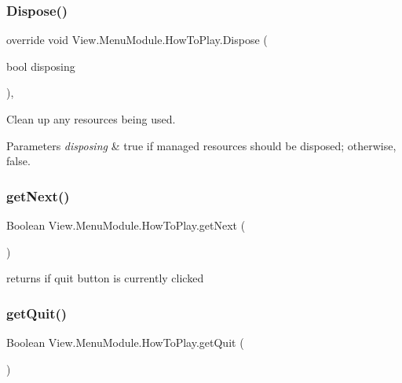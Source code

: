 \subsubsection{\texorpdfstring{Dispose()}{Dispose()}}
{\footnotesize\ttfamily override void View.\+Menu\+Module.\+How\+To\+Play.\+Dispose (\begin{DoxyParamCaption}\item[{bool}]{disposing }\end{DoxyParamCaption})\hspace{0.3cm}{\ttfamily [inline]}, {\ttfamily [protected]}}



Clean up any resources being used. 


\begin{DoxyParams}{Parameters}
{\em disposing} & true if managed resources should be disposed; otherwise, false.\\
\hline
\end{DoxyParams}
\hypertarget{class_view_1_1_menu_module_1_1_how_to_play_a5c48be1846170e30469c7523d95c2758}{}\label{class_view_1_1_menu_module_1_1_how_to_play_a5c48be1846170e30469c7523d95c2758} 
\subsubsection{\texorpdfstring{get\+Next()}{getNext()}}
{\footnotesize\ttfamily Boolean View.\+Menu\+Module.\+How\+To\+Play.\+get\+Next (\begin{DoxyParamCaption}{ }\end{DoxyParamCaption})\hspace{0.3cm}{\ttfamily [inline]}}

returns if quit button is currently clicked \hypertarget{class_view_1_1_menu_module_1_1_how_to_play_a08017898efa214bb31463d11875ed6d0}{}\label{class_view_1_1_menu_module_1_1_how_to_play_a08017898efa214bb31463d11875ed6d0} 
\subsubsection{\texorpdfstring{get\+Quit()}{getQuit()}}
{\footnotesize\ttfamily Boolean View.\+Menu\+Module.\+How\+To\+Play.\+get\+Quit (\begin{DoxyParamCaption}{ }\end{DoxyParamCaption})\hspace{0.3cm}{\ttfamily [inline]}}

